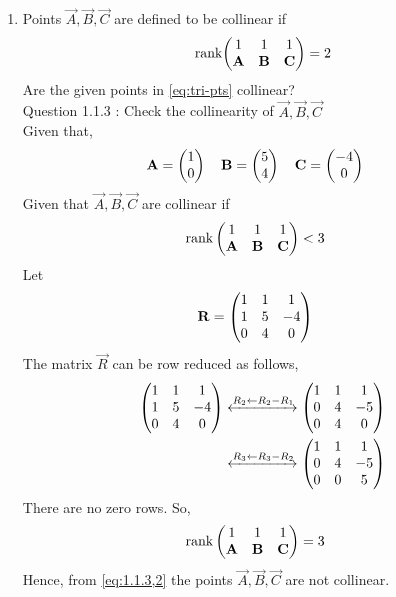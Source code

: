 \documentclass[11pt]{book}
\begin{document}
\begin{enumerate}[label=\thesection.\arabic*.,ref=\thesection.\theenumi]
\item   Points $\vec{A}, \vec{B}, \vec{C}$ are defined to be collinear if 
		\begin{align}
			\text{rank}{\ensuremath{\begin{pmatrix}1 & 1 & 1 \\ \mathbf{A}& \mathbf{B}&\mathbf{C}\end{pmatrix}}} = 2
		\end{align}
Are the given points in
			\eqref{eq:tri-pts}
collinear?\\
Question 1.1.3 : Check the collinearity of $\vec{A},\vec{B},\vec{C}$ \\ 
\solution 
Given that,
\begin{align}
    \mathbf{A} = \begin{pmatrix}1\\0\end{pmatrix}
    \quad
    \mathbf{B} &= \begin{pmatrix}5\\4\end{pmatrix}
    \quad
    \mathbf{C} = \begin{pmatrix}-4\\0\end{pmatrix}
\end{align}
Given that $\vec{A},\vec{B},\vec{C}$ are collinear if
\begin{align}
    \text{rank}\myvec{
    1 & 1 & 1\\
    \vec{A} & \vec{B} & \vec{C} \\
    } &< 3 
    \label{eq:1.1.3,2}
\end{align} 
Let
\begin{align}
    \mathbf{R}&=\begin{pmatrix}
    1 & 1 & 1
    \\
    1 & 5 & -4
    \\
    0 & 4 & 0
    \end{pmatrix} 
\end{align} 
The matrix $\vec{R}$ can be row reduced as follows,
\begin{align}
    \label{eq:matthrowoperations}
    \myvec{
    1 & 1 & 1
    \\
    1 & 5 & -4
    \\
    0 & 4 & 0
    }
     \xleftrightarrow[]{R_2 \leftarrow R_2-R_1}
    \myvec{
    1 & 1 & 1
    \\
    0 & 4 & -5
    \\
    0 & 4 & 0
    }
    \\
     \xleftrightarrow[]{R_3\leftarrow R_3-R_2}
    \myvec{
    1 & 1 & 1
    \\
    0 & 4 & -5
    \\
    0 & 0 & 5 
    }
\end{align}
There are no zero rows. So,
\begin{align}
    \text{rank}\begin{pmatrix}
    1 & 1 & 1\\
    \mathbf{A} & \mathbf{B} & \mathbf{C} \\
    \end{pmatrix} &= 3 
\end{align}  
Hence, from \eqref{eq:1.1.3,2} the points $\vec{A},\vec{B},\vec{C}$ are not collinear. 


\end{enumerate}
\end{document}
